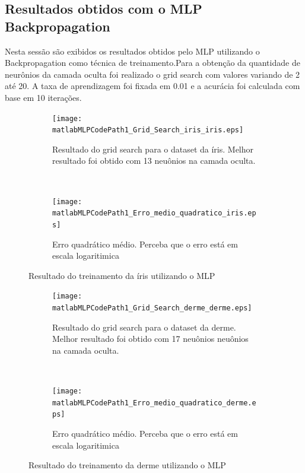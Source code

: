 \documentclass[
	article,			%
	11pt,				%
	oneside,			%
	a4paper,			%
	english,			%
	brazil,				%
	sumario=tradicional
	]{abntex2}
\newcommand{\matlabCodePath}{C:/Users/clifte/git/mestrado/Matlab/}
\newcommand{\matlabMLPCodePath}{\matlabCodePath Trabalho_RNA/trabalho2/MLP/}
\begin{document}
\subsection{Resultados obtidos com o MLP Backpropagation}
Nesta sessão são exibidos os resultados obtidos pelo MLP utilizando o
Backpropagation como técnica de treinamento.Para a obtenção da quantidade de
neurônios da camada oculta foi realizado o grid search com valores variando de 2
até 20. A taxa de aprendizagem foi fixada em 0.01 e a acurácia foi calculada com
base em 10 iterações.

\begin{figure} 
	\centering
	\begin{subfigure}[b]{0.4\textwidth}
		\texttt{[image: \\matlabMLPCodePath1\_Grid\_Search\_iris\_iris.eps]}
		\caption{Resultado do grid search para o dataset da íris. Melhor resultado foi
		obtido com 13 neuônios na camada oculta.}
	\end{subfigure}
    ~
    \begin{subfigure}[b]{0.4\textwidth}
		\texttt{[image: \\matlabMLPCodePath1\_Erro\_medio\_quadratico\_iris.eps]}
		\caption{Erro quadrático médio. Perceba que o erro está em escala
		logaritimica}
	\end{subfigure}     
  \caption{Resultado do treinamento da íris utilizando o MLP}
\end{figure}


\begin{figure} 
	\centering
	\begin{subfigure}[b]{0.4\textwidth}
		\texttt{[image: \\matlabMLPCodePath1\_Grid\_Search\_derme\_derme.eps]}
		\caption{Resultado do grid search para o dataset da derme. Melhor resultado
		foi obtido com 17 neuônios neuônios na camada oculta.}
	\end{subfigure}
    ~
    \begin{subfigure}[b]{0.4\textwidth}
		\texttt{[image: \\matlabMLPCodePath1\_Erro\_medio\_quadratico\_derme.eps]}
		\caption{Erro quadrático médio. Perceba que o erro está em escala
		logaritimica}
	\end{subfigure}     
  \caption{Resultado do treinamento da derme utilizando o MLP}
\end{figure}
\end{document}
